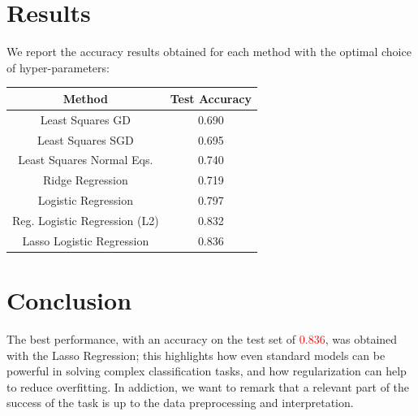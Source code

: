 \documentclass[10pt,conference,compsocconf]{IEEEtran}
\begin{document}
\section{Results}
\label{results}
We report the accuracy results obtained for each method with the optimal choice of hyper-parameters: \\


\begin{center}
\label{table1}
\begin{tabular}{|c c|} 
 \hline
 Method & Test Accuracy  \\ [0.5ex] 
 \hline\hline
 Least Squares GD & 0.690   \\ 
 \hline
 Least Squares SGD & 0.695  \\
 \hline
 Least Squares Normal Eqs. & 0.740   \\
 \hline
 Ridge Regression & 0.719   \\ 
 \hline
 Logistic Regression & 0.797   \\
 \hline
 Reg. Logistic Regression (L2) & 0.832   \\
 \hline
 Lasso Logistic Regression & 0.836   \\
 \hline
\end{tabular}
\end{center}

\vspace{3mm}

\section{Conclusion}

The best performance, with an accuracy on the test set of \textcolor{red}{0.836}, was obtained with the Lasso Regression; this highlights how even standard models can be powerful in solving complex classification tasks, and how regularization can help to reduce overfitting.
In addiction, we want to remark that a relevant part of the success of the task is up to the data preprocessing and interpretation.
\end{document}
